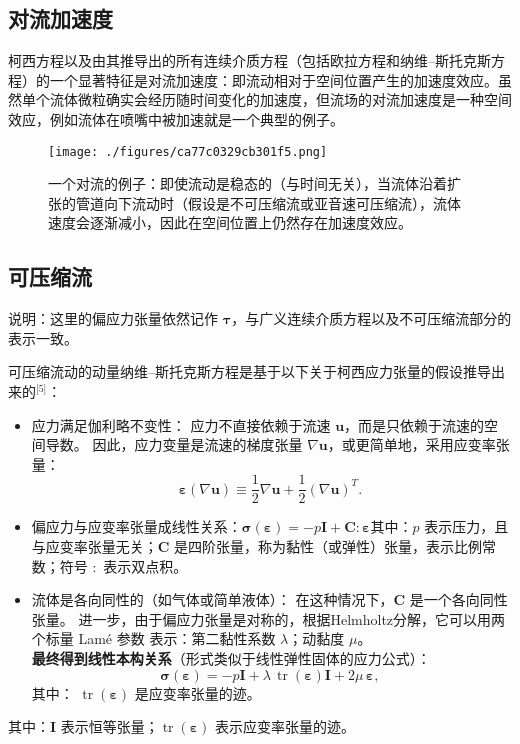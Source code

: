 \subsection{对流加速度}
柯西方程以及由其推导出的所有连续介质方程（包括欧拉方程和纳维–斯托克斯方程）的一个显著特征是对流加速度：即流动相对于空间位置产生的加速度效应。虽然单个流体微粒确实会经历随时间变化的加速度，但流场的对流加速度是一种空间效应，例如流体在喷嘴中被加速就是一个典型的例子。
\begin{figure}[ht]
\centering
\texttt{[image: ./figures/ca77c0329cb301f5.png]}
\caption{一个对流的例子：即使流动是稳态的（与时间无关），当流体沿着扩张的管道向下流动时（假设是不可压缩流或亚音速可压缩流），流体速度会逐渐减小，因此在空间位置上仍然存在加速度效应。} \label{fig_NWstks_1}
\end{figure}
\subsection{可压缩流}
说明：这里的偏应力张量依然记作 $\boldsymbol{\tau}$，与广义连续介质方程以及不可压缩流部分的表示一致。

可压缩流动的动量纳维–斯托克斯方程是基于以下关于柯西应力张量的假设推导出来的\(^\text{[5]}\)：
\begin{itemize}
\item 应力满足伽利略不变性：
   应力不直接依赖于流速 $\mathbf{u}$，而是只依赖于流速的空间导数。
   因此，应力变量是流速的梯度张量 $\nabla \mathbf{u}$，或更简单地，采用应变率张量：
   $$
   \boldsymbol{\varepsilon}(\nabla \mathbf{u})
   \equiv 
   \frac{1}{2}\nabla \mathbf{u}
   + \frac{1}{2}(\nabla \mathbf{u})^{T}.~
   $$
\item 偏应力与应变率张量成线性关系：$\boldsymbol{\sigma}(\boldsymbol{\varepsilon})= -p\mathbf{I}+ \mathbf{C} : \boldsymbol{\varepsilon}$其中：$p$ 表示压力，且与应变率张量无关；$\mathbf{C}$ 是四阶张量，称为黏性（或弹性）张量，表示比例常数；符号 $:$ 表示双点积。
\item 流体是各向同性的（如气体或简单液体）：
   在这种情况下，$\mathbf{C}$ 是一个各向同性张量。
   进一步，由于偏应力张量是对称的，根据Helmholtz分解，它可以用两个标量 Lamé 参数 表示：第二黏性系数 $\lambda$；动黏度 $\mu$。\\
   \textbf{最终得到线性本构关系}（形式类似于线性弹性固体的应力公式）：
   $$
   \boldsymbol{\sigma}(\boldsymbol{\varepsilon})
   = -p\mathbf{I}
   + \lambda \,\operatorname{tr}(\boldsymbol{\varepsilon})\mathbf{I}
   + 2\mu \,\boldsymbol{\varepsilon},~
   $$
   其中： $\operatorname{tr}(\boldsymbol{\varepsilon})$ 是应变率张量的迹。
\end{itemize}
其中：$\mathbf{I}$ 表示恒等张量；$\operatorname{tr}(\boldsymbol{\varepsilon})$ 表示应变率张量的迹。

